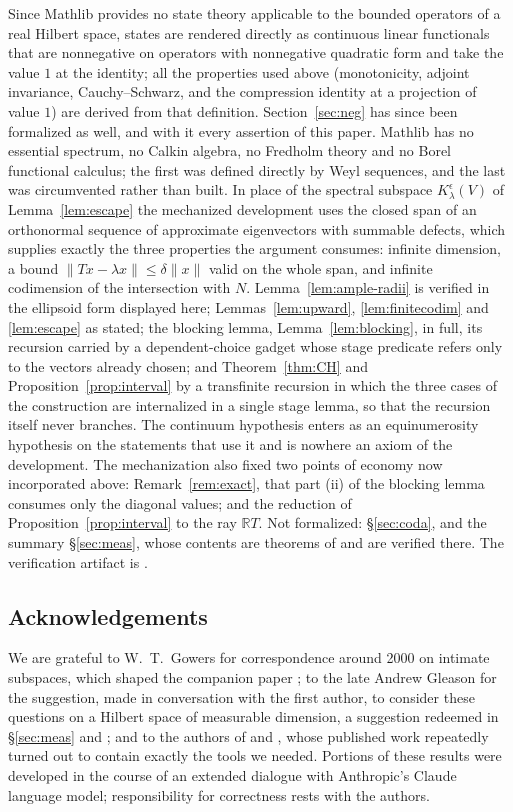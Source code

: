\documentclass[11pt,reqno]{amsart}
\theoremstyle{definition}
\newcommand{\R}{\mathbb{R}}
\begin{document}
Since Mathlib provides no state theory applicable to the bounded operators of a real
Hilbert space, states are rendered directly as continuous linear functionals that are
nonnegative on operators with nonnegative quadratic form and take the value $1$ at the
identity; all the properties used above (monotonicity, adjoint invariance,
Cauchy--Schwarz, and the compression identity at a projection of value $1$) are derived
from that definition. Section~\ref{sec:neg} has since been formalized as well, and with it every
assertion of this paper. Mathlib has no essential spectrum, no Calkin algebra, no
Fredholm theory and no Borel functional calculus; the first was defined directly by
Weyl sequences, and the last was circumvented rather than built. In place of the
spectral subspace $K^\epsilon_\lambda(V)$ of Lemma~\ref{lem:escape} the mechanized
development uses the closed span of an orthonormal sequence of approximate
eigenvectors with summable defects, which supplies exactly the three properties the
argument consumes: infinite dimension, a bound $\|Tx-\lambda x\|\le\delta\|x\|$
valid on the whole span, and infinite codimension of the intersection with $N$.
Lemma~\ref{lem:ample-radii} is verified in the ellipsoid form displayed here;
Lemmas~\ref{lem:upward}, \ref{lem:finitecodim} and \ref{lem:escape} as stated; the
blocking lemma, Lemma~\ref{lem:blocking}, in full, its recursion carried by a
dependent-choice gadget whose stage predicate refers only to the vectors already
chosen; and Theorem~\ref{thm:CH} and Proposition~\ref{prop:interval} by a
transfinite recursion in which the three cases of the construction are internalized
in a single stage lemma, so that the recursion itself never branches. The continuum
hypothesis enters as an equinumerosity hypothesis on the statements that use it and
is nowhere an axiom of the development. The mechanization also fixed two points of economy now incorporated above:
Remark~\ref{rem:exact}, that part (ii) of the blocking lemma consumes only the diagonal
values; and the reduction of Proposition~\ref{prop:interval} to the ray $\R T$. Not formalized: \S\ref{sec:coda}, and the summary
\S\ref{sec:meas}, whose contents are theorems of \cite{FWIII} and are verified
there. The verification artifact is \cite{plufLean}.

\subsection*{Acknowledgements}
We are grateful to W.~T.~Gowers for correspondence around 2000 on intimate subspaces,
which shaped the companion paper \cite{FWII}; to the late Andrew Gleason for the
suggestion, made in conversation with the first author, to consider these questions on a
Hilbert space of measurable dimension, a suggestion redeemed in \S\ref{sec:meas} and
\cite{FWIII}; and to the authors of \cite{BlecherWeaver} and \cite{FarahWofsey}, whose
published work repeatedly turned out to contain exactly the tools we needed. Portions of
these results were developed in the course of an extended dialogue with Anthropic's
Claude language model; responsibility for correctness rests with the authors.
\end{document}
